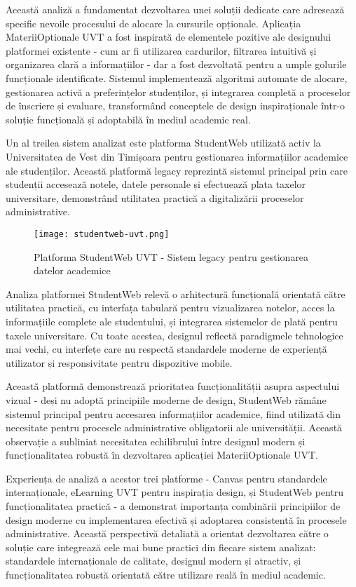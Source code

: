 \documentclass[12pt,a4paper]{report}
\begin{document}
Această analiză a fundamentat dezvoltarea unei soluții dedicate care adresează specific nevoile procesului de alocare la cursurile opționale. Aplicația MateriiOptionale UVT a fost inspirată de elementele pozitive ale designului platformei existente - cum ar fi utilizarea cardurilor, filtrarea intuitivă și organizarea clară a informațiilor - dar a fost dezvoltată pentru a umple golurile funcționale identificate. Sistemul implementează algoritmi automate de alocare, gestionarea activă a preferințelor studenților, și integrarea completă a proceselor de înscriere și evaluare, transformând conceptele de design inspiraționale într-o soluție funcțională și adoptabilă în mediul academic real.

Un al treilea sistem analizat este platforma StudentWeb utilizată activ la Universitatea de Vest din Timișoara pentru gestionarea informațiilor academice ale studenților. Această platformă legacy reprezintă sistemul principal prin care studenții accesează notele, datele personale și efectuează plata taxelor universitare, demonstrând utilitatea practică a digitalizării proceselor administrative.

\begin{figure}[H]
\centering
\texttt{[image: studentweb-uvt.png]}
\caption{Platforma StudentWeb UVT - Sistem legacy pentru gestionarea datelor academice}
\label{fig:studentweb-uvt}
\end{figure}

Analiza platformei StudentWeb relevă o arhitectură funcțională orientată către utilitatea practică, cu interfața tabulară pentru vizualizarea notelor, acces la informațiile complete ale studentului, și integrarea sistemelor de plată pentru taxele universitare. Cu toate acestea, designul reflectă paradigmele tehnologice mai vechi, cu interfețe care nu respectă standardele moderne de experiență utilizator și responsivitate pentru dispozitive mobile.

Această platformă demonstrează prioritatea funcționalității asupra aspectului vizual - deși nu adoptă principiile moderne de design, StudentWeb rămâne sistemul principal pentru accesarea informațiilor academice, fiind utilizată din necesitate pentru procesele administrative obligatorii ale universității. Această observație a subliniat necesitatea echilibrului între designul modern și funcționalitatea robustă în dezvoltarea aplicației MateriiOptionale UVT.

Experiența de analiză a acestor trei platforme - Canvas pentru standardele internaționale, eLearning UVT pentru inspirația design, și StudentWeb pentru funcționalitatea practică - a demonstrat importanța combinării principiilor de design moderne cu implementarea efectivă și adoptarea consistentă în procesele administrative. Această perspectivă detaliată a orientat dezvoltarea către o soluție care integrează cele mai bune practici din fiecare sistem analizat: standardele internaționale de calitate, designul modern și atractiv, și funcționalitatea robustă orientată către utilizare reală în mediul academic.
\end{document}
